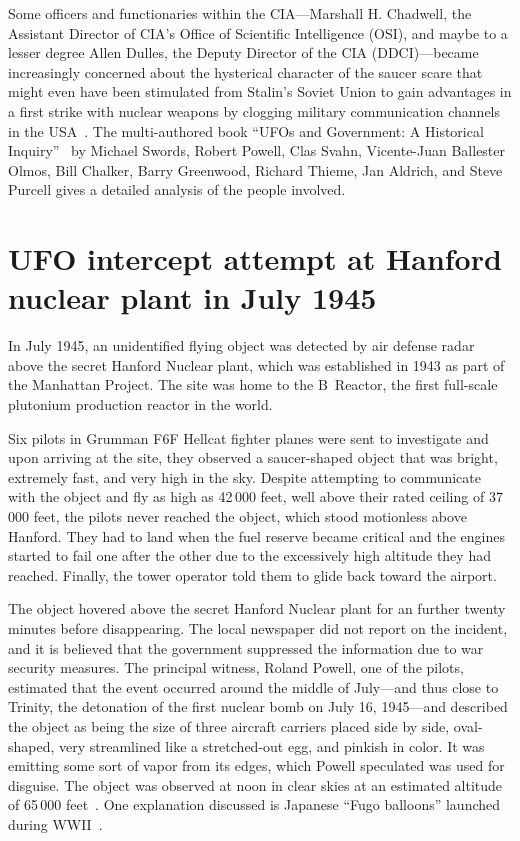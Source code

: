 Some officers and functionaries within the CIA---Marshall H.  Chadwell, the Assistant Director of CIA's Office of Scientific Intelligence (OSI),
and maybe to a lesser degree Allen Dulles, the
Deputy Director of the CIA (DDCI)---became increasingly concerned
about the hysterical character of the saucer scare that might even have been stimulated from Stalin's Soviet Union to gain advantages in a
first strike with nuclear weapons by clogging military communication channels in the USA~\cite{Haines-CIA-UFO}.
The multi-authored book ``{UFO}s and Government: {A} Historical Inquiry''~\cite{Swords2012Jul}
by Michael Swords,  Robert Powell,  Clas Svahn, Vicente-Juan Ballester Olmos,
Bill Chalker,  Barry Greenwood,
Richard Thieme,  Jan Aldrich, and Steve Purcell gives a detailed analysis of the people involved.


\section{UFO intercept attempt at Hanford nuclear plant in July 1945}\label{2023-UFO-part-History-chapter-post-1945-pre-1953-HP}

In July 1945, an unidentified flying object was detected by air defense radar above the secret Hanford Nuclear plant,
which was established in 1943 as part of the Manhattan Project.
The site was home to the B~Reactor, the first full-scale plutonium production reactor in the world.

Six pilots in Grumman F6F Hellcat fighter planes were sent to investigate and upon arriving at the site,
they observed a saucer-shaped object that was bright, extremely fast, and very high in the sky.
Despite attempting to communicate with the object and fly as high as 42\,000 feet,
well above their rated ceiling of 37\,000 feet, the pilots never reached the object,
which stood motionless above Hanford.
They had to land when the fuel reserve became critical and the engines started to fail one after the other due to the excessively high altitude they had reached. Finally, the tower operator told them to glide back toward the airport.

The object hovered above the secret Hanford Nuclear plant for an further twenty minutes before disappearing.
The local newspaper did not report on the incident, and it is believed that the government suppressed the information due to war security measures.
The principal witness, Roland Powell, one of the pilots, estimated that the event occurred around the middle of July---and
thus close to Trinity, the detonation of the first nuclear bomb on July 16, 1945---and described the object as being the size of three aircraft carriers placed side by side, oval-shaped, very streamlined like a stretched-out egg, and pinkish in color. It was emitting some sort of vapor from its edges, which Powell speculated was used for disguise. The object was observed at noon in clear skies at an estimated altitude of 65\,000 feet~\cite{Adam2009Oct}. One explanation discussed is Japanese ``Fugo balloons'' launched during WWII~\cite{Gross2021Sep}.


